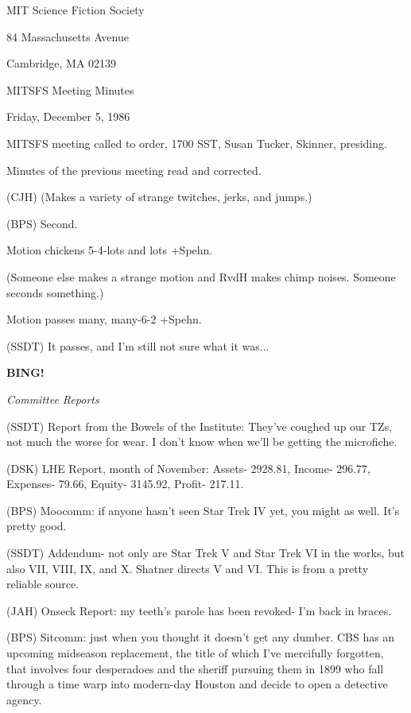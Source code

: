 \documentclass[12pt]{article}
\newcommand{\bing}{{\bf BING!} }
\newcommand{\goto}[1]{\bing \vskip 12pt \centerline{{\em{#1}}}}
\begin{document}
\begin{center}

MIT Science Fiction Society 

84 Massachusetts Avenue

Cambridge, MA 02139

\vspace{12pt}

MITSFS Meeting Minutes 

Friday, December 5, 1986

\end{center}
 
\vspace{18pt}

\setlength{\parskip}{6pt}

\noindent
MITSFS meeting called to order, 1700 SST,
Susan Tucker, Skinner, presiding.

Minutes of the previous meeting read and corrected.

(CJH) (Makes a variety of strange twitches, jerks, and jumps.)

(BPS) Second.

Motion chickens 5-4-lots and lots +Spehn.

(Someone else makes a strange motion and RvdH makes chimp noises. Someone seconds something.)

Motion passes many, many-6-2 +Spehn.

(SSDT) It passes, and I'm still not sure what it was...

\goto{Committee Reports}

(SSDT) Report from the Bowels of the Institute: They've coughed up our TZs, not much the worse for wear. I don't know when we'll be getting the microfiche.

(DSK) LHE Report, month of November: Assets- 2928.81, Income- 296.77, Expenses- 79.66, Equity- 3145.92, Profit- 217.11.

(BPS) Moocomm: if anyone hasn't seen Star Trek IV yet, you might as well. It's pretty good.

(SSDT) Addendum- not only are Star Trek V and Star Trek VI in the works, but also VII, VIII, IX, and X. Shatner directs V and VI. This is from a pretty reliable source.

(JAH) Onseck Report: my teeth's parole has been revoked- I'm back in braces.

(BPS) Sitcomm: just when you thought it doesn't get any dumber. CBS has an upcoming midseason replacement, the title of which I've mercifully forgotten, that involves four desperadoes and the sheriff pursuing them in 1899 who fall through a time warp into modern-day Houston and decide to open  a detective agency.
\end{document}
